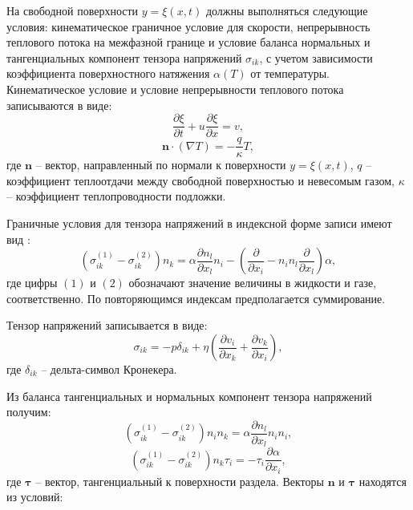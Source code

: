 \documentclass[12pt,a4paper]{article}
\begin{document}
На свободной поверхности $y = \xi(x, t)$ должны выполняться следующие условия: кинематическое граничное условие для скорости, непрерывность теплового потока на межфазной границе и условие баланса нормальных и тангенциальных компонент тензора напряжений $\sigma_{ik}$, с учетом зависимости коэффициента поверхностного натяжения $\alpha(T)$ от температуры. Кинематическое условие и условие непрерывности теплового потока записываются в виде:
\begin{equation}\label{eq:surface_velocity_bc_thermal}
	\frac{\partial \xi}{\partial t} + u \frac{\partial \xi}{\partial x} = v,
\end{equation}
\begin{equation}\label{eq:one_layer_bc_thermal}
	\mathbf{n} \cdot (\nabla T) = -\frac{q}{\kappa} T,
\end{equation}
где $\mathbf{n}$ -- вектор, направленный по нормали к поверхности   $y = \xi(x, t)$, $q$ -- коэффициент теплоотдачи между свободной поверхностью и невесомым газом, $\kappa$ -- коэффициент теплопроводности подложки.

Граничные условия для тензора напряжений в индексной форме записи имеют вид \cite{Birikh2003}:
\begin{equation*}
	\left( \sigma^{ (1)}_{ik} - \sigma^{ (2)}_{ik} \right) n_k = \alpha \frac{\partial n_l}{\partial x_l} n_i - \left( \frac{\partial}{\partial x_i} - n_i n_l \frac{\partial}{\partial x_l} \right)\alpha,
\end{equation*}
где цифры $(1)$ и $(2)$ обозначают значение величины в жидкости и газе, соответственно. По повторяющимся индексам предполагается суммирование.

Тензор напряжений записывается в виде:
\begin{equation*}
	\sigma_{ik} = -p \delta_{ik} + \eta \left( \frac{\partial v_i}{\partial x_k} + \frac{\partial v_k}{\partial x_i} \right),
\end{equation*}
где $\delta_{ik}$ -- дельта-символ Кронекера.


Из баланса тангенциальных и нормальных компонент тензора напряжений получим:
\begin{equation}\label{eq:viscous_normal_bc_thermal}
	\left( \sigma^{ (1)}_{ik} - \sigma^{ (2)}_{ik} \right) n_i n_k = \alpha \frac{\partial n_l}{\partial x_l} n_i n_i,
\end{equation}
\begin{equation}\label{eq:viscous_tangential_bc_thermal}
	\left( \sigma^{ (1)}_{ik} - \sigma^{ (2)}_{ik} \right) n_k \tau_i = -\tau_i \frac{\partial \alpha}{\partial x_i},
\end{equation}
где $\mathbf{\tau}$ -- вектор, тангенциальный к поверхности раздела. Векторы $\mathbf{n}$ и  $\mathbf{\tau}$ находятся из условий:
\end{document}
